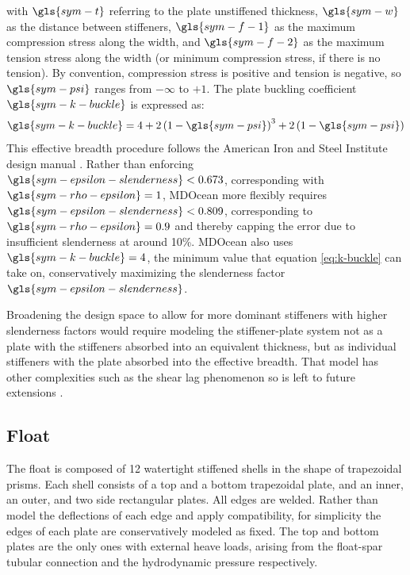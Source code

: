 with $\gls{sym-t}$ referring to the plate unstiffened thickness, $\gls{sym-w}$ as the distance between stiffeners, $\gls{sym-f-1}$ as the maximum compression stress along the width, and $\gls{sym-f-2}$ as the maximum tension stress along the width (or minimum compression stress, if there is no tension).
By convention, compression stress is positive and tension is negative, so $\gls{sym-psi}$ ranges from $-\infty$ to $+1$.
The plate buckling coefficient $\gls{sym-k-buckle}$ is expressed as:
\begin{equation}\label{eq:k-buckle}
  \gls{sym-k-buckle} = 4+2\left(1-\gls{sym-psi}\right)^3+2\left(1-\gls{sym-psi}\right)
\end{equation}
This effective breadth procedure follows the American Iron and Steel Institute design manual \citep{american_iron_and_steel_institute_cold-formed_1991}.
Rather than enforcing $\gls{sym-epsilon-slenderness}<0.673$, corresponding with $\gls{sym-rho-epsilon}=1$, MDOcean more flexibly requires $\gls{sym-epsilon-slenderness}<0.809$, corresponding to $\gls{sym-rho-epsilon}=0.9$ and thereby capping the error due to insufficient slenderness at around 10\%.
MDOcean also uses $\gls{sym-k-buckle}=4$, the minimum value that equation \eqref{eq:k-buckle} can take on, conservatively maximizing the slenderness factor $\gls{sym-epsilon-slenderness}$.

Broadening the design space to allow for more dominant stiffeners with higher slenderness factors would require modeling the stiffener-plate system not as a plate with the stiffeners absorbed into an equivalent thickness, but as individual stiffeners with the plate absorbed into the effective breadth.
That model has other complexities such as the shear lag phenomenon so is left to future extensions \citep{wierzbicki_lecture_2013,american_iron_and_steel_institute_cold-formed_1991}.


\subsection{Float}
The float is composed of 12 watertight stiffened shells in the shape of trapezoidal prisms.
Each shell consists of a top and a bottom trapezoidal plate, and an inner, an outer, and two side rectangular plates.
All edges are welded.
Rather than model the deflections of each edge and apply compatibility, for simplicity the edges of each plate are conservatively modeled as fixed.
The top and bottom plates are the only ones with external heave loads, arising from the float-spar tubular connection and the hydrodynamic pressure respectively.

